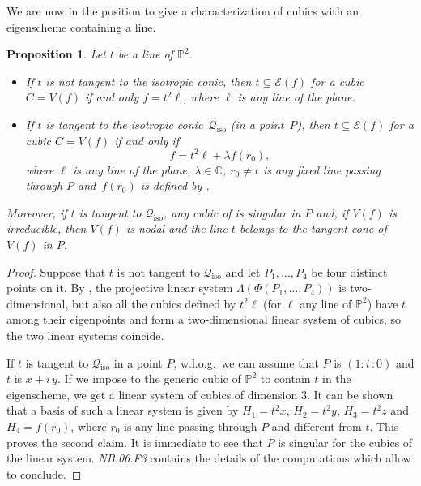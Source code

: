 \documentclass[a4paper, 11pt, reqno]{amsart}
\theoremstyle{plain}
\newtheorem{prop}[lemma]{Proposition}
\theoremstyle{definition}
\newcommand{\C}{\mathbb{C}}
\newcommand{\nb}[2]{\textsl{{NB}.{#1}.{#2}}}
\newcommand{\iii}{\textit{i}\,}
\newcommand{\iso}{\mathcal{Q}_{\mathrm{iso}}}
\newcommand{\Eig}[1]{\mathcal{E}\!\left( {#1} \right)}
\begin{document}
We are now in the position to give a characterization of cubics with an eigenscheme containing a line.
\begin{prop}
\label{proposition:eigenline_tangent}
Let $t$ be a line of $\mathbb{P}^2$.
%
\begin{itemize}
   \item
   If $t$ is not tangent to the isotropic conic, then $t \subseteq \Eig{f}$ for a cubic $C=V(f)$ if and
only $f = t^2\ell$, where $\ell$ is any line of the plane.
  \item
  If $t$ is tangent to the isotropic conic~$\iso$ (in a point~$P$),
then $t \subseteq \Eig{f}$ for a cubic $C=V(f)$ if and only if
  \begin{equation}
  \label{eq:cubics_with_tangent_eigenline}
    f = t^2 \ell+\lambda f(r_0),
  \end{equation}
  where $\ell$ is any line of the plane, $\lambda \in \C$,
  $r_0\neq t$ is any fixed line passing through $P$
  and~$f(r_0)$ is defined by .
  \end{itemize}
  Moreover, if $t$ is tangent to $\iso$, any cubic of
   is singular in $P$ and, if $V(f)$ is irreducible, then $V(f)$ is nodal and the line $t$ belongs to the tangent cone of $V(f)$ in $P$.
%
\end{prop}
\begin{proof}
Suppose that $t$ is not tangent to $\iso$ and let $P_1, \dots, P_4$ be four
distinct points on it. By , the projective linear system
$\Lambda(\Phi(P_1, \dotsc, P_4))$ is two-dimensional, but also all the cubics
defined by $t^2\ell$ (for $\ell$ any line of $\mathbb{P}^2$) have $t$ among
their eigenpoints and form a
two-dimensional linear system of cubics, so the two linear systems
coincide.

If $t$ is tangent to $\iso$ in a point $P$, w.l.o.g.\ we can assume that
$P$ is $(1: \iii: 0)$ and $t$ is $x+\iii y$. If we impose to the generic
cubic of $\mathbb{P}^2$ to contain $t$ in the eigenscheme, we get a linear
system of cubics of dimension $3$. It can be shown that a basis of such a linear system is given by $H_1 = t^2x$, $H_2 = t^2y$, $H_3 = t^2z$ and
$H_4 = f(r_0)$, where $r_0$ is any line passing through $P$ and different from $t$. This proves the
second claim. It is immediate to see that $P$ is singular for the cubics of the linear system. \nb{06}{F3} contains the details of the computations which allow to conclude.
\end{proof}
\end{document}
